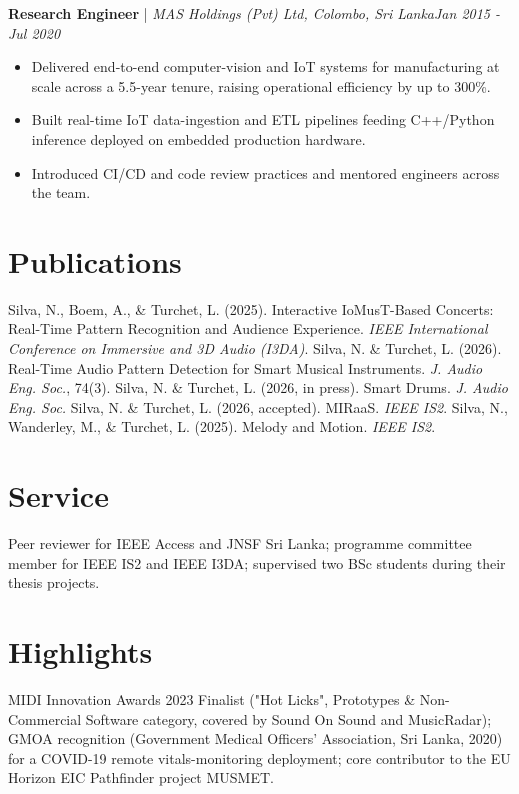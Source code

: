 \documentclass[11pt]{article}
\newenvironment{cvrole}[5]{%
  \par\noindent\textbf{\large #1} | \textit{\small #2, #3}\hfill \textit{\small #4 - #5}\par
  \begin{itemize}[leftmargin=2em, itemsep=-0.3em, topsep=-0.5em]%
}{%
  \end{itemize}\par\noindent\mbox{}\par\vspace{0.1em}%
}
\begin{document}
\begin{cvrole}{Research Engineer}{MAS Holdings (Pvt) Ltd}{Colombo, Sri Lanka}{Jan 2015}{Jul 2020}
  \item Delivered end-to-end computer-vision and IoT systems for manufacturing at scale across a 5.5-year tenure, raising operational efficiency by up to 300\%.
  \item Built real-time IoT data-ingestion and ETL pipelines feeding C++/Python inference deployed on embedded production hardware.
  \item Introduced CI/CD and code review practices and mentored engineers across the team.
\end{cvrole}

\section*{Publications}
Silva, N., Boem, A., \& Turchet, L. (2025). Interactive IoMusT-Based Concerts: Real-Time Pattern Recognition and Audience Experience. \textit{IEEE International Conference on Immersive and 3D Audio (I3DA)}. Silva, N. \& Turchet, L. (2026). Real-Time Audio Pattern Detection for Smart Musical Instruments. \textit{J. Audio Eng. Soc.}, 74(3). Silva, N. \& Turchet, L. (2026, in press). Smart Drums. \textit{J. Audio Eng. Soc.} Silva, N. \& Turchet, L. (2026, accepted). MIRaaS. \textit{IEEE IS2}. Silva, N., Wanderley, M., \& Turchet, L. (2025). Melody and Motion. \textit{IEEE IS2}.

\section*{Service}
Peer reviewer for IEEE Access and JNSF Sri Lanka; programme committee member for IEEE IS2 and IEEE I3DA; supervised two BSc students during their thesis projects.

\section*{Highlights}
MIDI Innovation Awards 2023 Finalist ("Hot Licks", Prototypes \& Non-Commercial Software category, covered by Sound On Sound and MusicRadar); GMOA recognition (Government Medical Officers' Association, Sri Lanka, 2020) for a COVID-19 remote vitals-monitoring deployment; core contributor to the EU Horizon EIC Pathfinder project MUSMET.
\end{document}
